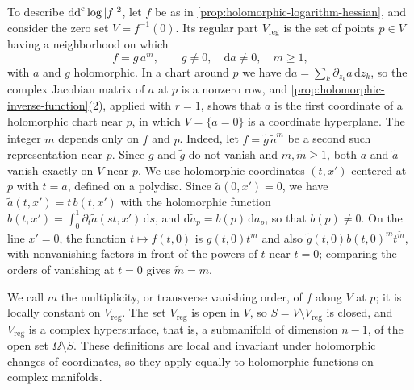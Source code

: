 To describe $\mathrm{dd}^{\mathrm{c}}\log|f|^2$, let $f$ be as in \cref{prop:holomorphic-logarithm-hessian}, and consider the zero set $V=f^{-1}(0)$. Its regular part $V_{\mathrm{reg}}$ is the set of points $p\in V$ having a neighborhood on which
\[
 f=g\,a^m,\qquad g\ne0,\quad \mathrm{d}a\ne0,\quad m\ge1,
\]
with $a$ and $g$ holomorphic. In a chart around $p$ we have $\mathrm da=\sum_k\partial_{z_k}a\,\mathrm dz_k$, so the complex Jacobian matrix of $a$ at $p$ is a nonzero row, and \cref{prop:holomorphic-inverse-function}(2), applied with $r=1$, shows that $a$ is the first coordinate of a holomorphic chart near $p$, in which $V=\{a=0\}$ is a coordinate hyperplane. The integer $m$ depends only on $f$ and $p$. Indeed, let $f=\widetilde g\,\widetilde a^{\widetilde m}$ be a second such representation near $p$. Since $g$ and $\widetilde g$ do not vanish and $m,\widetilde m\geq1$, both $a$ and $\widetilde a$ vanish exactly on $V$ near $p$. We use holomorphic coordinates $(t,x')$ centered at $p$ with $t=a$, defined on a polydisc. Since $\widetilde a(0,x')=0$, we have $\widetilde a(t,x')=t\,b(t,x')$ with the holomorphic function $b(t,x')=\int_0^1\partial_t\widetilde a(st,x')\,\mathrm ds$, and $\mathrm d\widetilde a_p=b(p)\,\mathrm da_p$, so that $b(p)\neq0$. On the line $x'=0$, the function $t\mapsto f(t,0)$ is $g(t,0)t^m$ and also $\widetilde g(t,0)b(t,0)^{\widetilde m}t^{\widetilde m}$, with nonvanishing factors in front of the powers of $t$ near $t=0$; comparing the orders of vanishing at $t=0$ gives $\widetilde m=m$.

We call $m$ the multiplicity, or transverse vanishing order, of $f$ along $V$ at $p$; it is locally constant on $V_{\mathrm{reg}}$. The set $V_{\mathrm{reg}}$ is open in $V$, so $S=V\setminus V_{\mathrm{reg}}$ is closed, and $V_{\mathrm{reg}}$ is a complex hypersurface, that is, a submanifold of dimension $n-1$, of the open set $\Omega\setminus S$. These definitions are local and invariant under holomorphic changes of coordinates, so they apply equally to holomorphic functions on complex manifolds.

